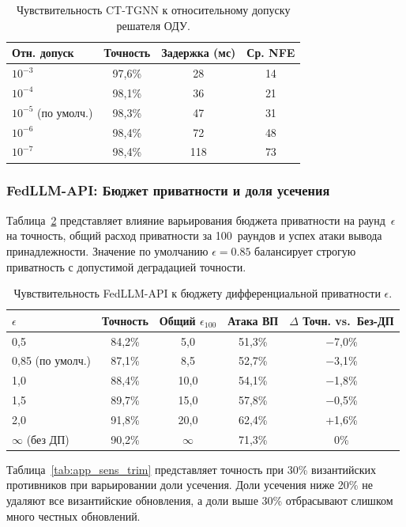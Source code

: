 \begin{table}[htbp]
\centering
\caption{Чувствительность CT-TGNN к относительному допуску решателя ОДУ.}
\label{tab:app_sens_tol}
\begin{tabular}{lccc}
\toprule
Отн. допуск & Точность & Задержка (мс) & Ср. NFE \\
\midrule
$10^{-3}$ & 97,6\% & 28 & 14 \\
$10^{-4}$ & 98,1\% & 36 & 21 \\
$10^{-5}$ (по умолч.) & 98,3\% & 47 & 31 \\
$10^{-6}$ & 98,4\% & 72 & 48 \\
$10^{-7}$ & 98,4\% & 118 & 73 \\
\bottomrule
\end{tabular}
\end{table}


\subsubsection{FedLLM-API: Бюджет приватности и доля усечения}

Таблица~\ref{tab:app_sens_dp} представляет влияние варьирования бюджета приватности на раунд~$\epsilon$ на точность, общий расход приватности за 100~раундов и успех атаки вывода принадлежности. Значение по умолчанию $\epsilon=0.85$ балансирует строгую приватность с допустимой деградацией точности.

\begin{table}[htbp]
\centering
\caption{Чувствительность FedLLM-API к бюджету дифференциальной приватности $\epsilon$.}
\label{tab:app_sens_dp}
\begin{tabular}{lcccc}
\toprule
$\epsilon$ & Точность & Общий $\epsilon_{100}$ & Атака ВП & $\Delta$ Точн. vs.\ Без-ДП \\
\midrule
0,5  & 84,2\% & 5,0  & 51,3\% & $-$7,0\% \\
0,85 (по умолч.) & 87,1\% & 8,5  & 52,7\% & $-$3,1\% \\
1,0  & 88,4\% & 10,0 & 54,1\% & $-$1,8\% \\
1,5  & 89,7\% & 15,0 & 57,8\% & $-$0,5\% \\
2,0  & 91,8\% & 20,0 & 62,4\% & +1,6\% \\
$\infty$ (без ДП) & 90,2\% & $\infty$ & 71,3\% & 0\% \\
\bottomrule
\end{tabular}
\end{table}

Таблица~\ref{tab:app_sens_trim} представляет точность при 30\% византийских противников при варьировании доли усечения. Доли усечения ниже 20\% не удаляют все византийские обновления, а доли выше 30\% отбрасывают слишком много честных обновлений.

